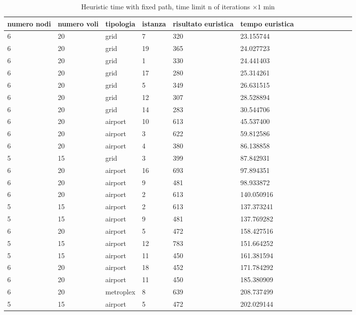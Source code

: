 \documentclass[../thesis.tex]{subfiles}
\begin{document}
\begin{table}[!ht]
\caption{Heuristic time with fixed path, time limit n of iterations $\times 1$ min}
    \centering
    \begin{tabularx}{\textwidth}{|X|X|X|X|X|X|X|X|X|X|X|X|X|X|}
    \hline
        numero nodi & numero voli & tipologia & istanza & risultato euristica & tempo euristica \\ \hline
        6 & 20 & grid & 7 & 320 & 23.155744 \\ \hline
        6 & 20 & grid & 19 & 365 & 24.027723 \\ \hline
        6 & 20 & grid & 1 & 330 & 24.441403 \\ \hline
        6 & 20 & grid & 17 & 280 & 25.314261 \\ \hline
        6 & 20 & grid & 5 & 349 & 26.631515 \\ \hline
        6 & 20 & grid & 12 & 307 & 28.528894 \\ \hline
        6 & 20 & grid & 14 & 283 & 30.544706 \\ \hline
        6 & 20 & airport & 10 & 613 & 45.537400 \\ \hline
        6 & 20 & airport & 3 & 622 & 59.812586 \\ \hline
        6 & 20 & airport & 4 & 380 & 86.138858 \\ \hline
        5 & 15 & grid & 3 & 399 & 87.842931 \\ \hline
        6 & 20 & airport & 16 & 693 & 97.894351 \\ \hline
        6 & 20 & airport & 9 & 481 & 98.933872 \\ \hline
        6 & 20 & airport & 2 & 613 & 140.050916 \\ \hline
        5 & 15 & airport & 2 & 613 & 137.373241 \\ \hline
        5 & 15 & airport & 9 & 481 & 137.769282 \\ \hline
        6 & 20 & airport & 5 & 472 & 158.427516 \\ \hline
        5 & 15 & airport & 12 & 783 & 151.664252 \\ \hline
        5 & 15 & airport & 11 & 450 & 161.381594 \\ \hline
        6 & 20 & airport & 18 & 452 & 171.784292 \\ \hline
        6 & 20 & airport & 11 & 450 & 185.380909 \\ \hline
        6 & 20 & metroplex & 8 & 639 & 208.737499 \\ \hline
        5 & 15 & airport & 5 & 472 & 202.029144 \\ \hline

\end{tabularx}
\end{table}
\end{document}
